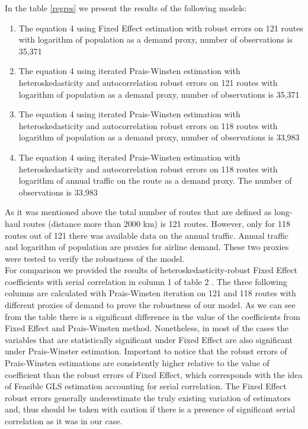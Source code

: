 \documentclass[titlepage, 11pt]{article}
\begin{document}
In the table \ref{regres} we present the results of the following models: 
\begin{enumerate}
\item The equation 4 using Fixed Effect estimation with robust errors on 121 routes with logarithm of population as a demand proxy, number of observations is 35,371 
\item The equation 4 using iterated Prais-Winsten estimation with heteroskedasticity and autocorrelation robust errors on 121 routes with logarithm of population as a demand proxy,  number of observations is 35,371
\item The equation 4 using iterated Prais-Winsten estimation with heteroskedasticity and autocorrelation robust errors on 118 routes with logarithm of population as a demand proxy, number of observations is 33,983
\item The equation 4 using iterated Prais-Winsten estimation with heteroskedasticity and autocorrelation robust errors on 118 routes with logarithm of annual traffic on the route as a demand proxy. The number of observations is 33,983
\end{enumerate}
\tab As it was mentioned above the total number of routes that are defined as long-haul routes (distance more than 2000 km) is 121 routes. However, only for 118 routes out of 121 there was available data on the annual traffic. Annual traffic and logarithm of population are proxies for airline demand. These two proxies were tested to verify the robustness of the model.  \\ 
\tab For comparison we provided the results of heteroskedasticity-robust Fixed Effect coefficients with serial correlation in column 1 of table 2 . The three following columns are calculated with Prais-Winsten iteration on 121 and 118 routes with different proxies of demand to prove the robustness of our model. As we can see from the table there is a significant difference in the value of the coefficients from Fixed  Effect and Prais-Winsten method. Nonetheless, in most of the cases the variables that are statistically significant under Fixed Effect are also significant under Prais-Winster estimation. Important to notice that the robust errors of Prais-Winsten estimations are consistently higher relative to the value of coefficient than the robust errors of Fixed Effect, which corresponds with the idea of Feasible GLS estimation accounting for serial correlation. The Fixed Effect robust errors generally underestimate the truly existing variation of estimators and, thus should be taken with caution if there is a presence of significant serial correlation as it was in our case.\\ \tab 
\end{document}
